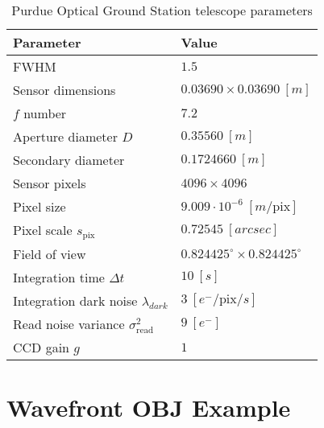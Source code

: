 \begin{table}[ht]
    \centering
    \begin{tabular}{|l|l|}
    \hline
    \textbf{Parameter} & \textbf{Value} \\ \hline
    FWHM                & $1.5$                              \\ \hline
    Sensor dimensions    & $ 0.03690 \times 0.03690 \: [m]$                               \\ \hline
    $f$ number   & $7.2$                              \\ \hline
    Aperture diameter $D$       & $0.35560 \: [m]$                              \\ \hline
    Secondary diameter         & $0.1724660 \: [m]$                              \\ \hline
    Sensor pixels               & $4096 \times 4096$                              \\ \hline
    Pixel size               & $9.009 \cdot 10^{-6} \: [m / \textrm{pix}]$                              \\ \hline
    Pixel scale $s_\mathrm{pix}$              & $0.72545 \: [arcsec]$                              \\ \hline
    Field of view               & $0.824425^\circ \times 0.824425^\circ$                              \\ \hline
    Integration time $\Delta t$              & $10 \: [s]$                              \\ \hline
    Integration dark noise $\lambda_{dark}$ & $3 \: \left[ e^- / \mathrm{pix} / s\right]$ \\ \hline
    Read noise variance $\sigma_\mathrm{read}^2$ & $9 \: \left[ e^- \right]$ \\ \hline
    CCD gain $g$ & $1$ \\ \hline
    \end{tabular}
    \caption{Purdue Optical Ground Station telescope parameters}
    \label{tb:pogs_parameters}
  \end{table}

\clearpage
\section{Wavefront OBJ Example} \label{sec:obj_listing}

\begin{listing}[ht]
    \inputminted[breaklines=true, breakanywhere=true, breaksymbol=\hspace{0pt}, fontsize=\scriptsize]{text}{/Users/liamrobinson/Documents/PyLightCurves/mirage/resources/models/cube.obj}
\end{listing}